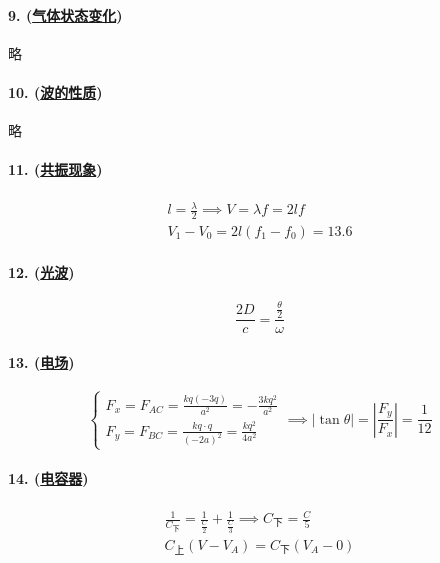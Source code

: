 \paragraph{9. (\hyperref[subsec:气体状态变化]{气体状态变化})} 略

\paragraph{10. (\hyperref[subsec:波的性质]{波的性质})} 略

\paragraph{11. (\hyperref[subsec:共振现象]{共振现象})}

\begin{gather*}
    l=\frac\lambda2\implies V=\lambda f=2lf\\
    V_1-V_0=2l(f_1-f_0)=13.6
\end{gather*}

\paragraph{12. (\hyperref[sec:光波]{光波})}

\begin{equation*}
    \frac{2D}{c}=\frac{\frac\theta2}{\omega}
\end{equation*}

\paragraph{13. (\hyperref[subsec:电场]{电场})}

\begin{equation*}
    \begin{cases}
        F_x=F_{AC}=\frac{kq(-3q)}{a^2}=-\frac{3kq^2}{a^2}\\
        F_y=F_{BC}=\frac{kq\cdot q}{(-2a)^2}=\frac{kq^2}{4a^2}
    \end{cases}\implies
    |\tan\theta|=\left|\frac{F_y}{F_x}\right|=\frac{1}{12}
\end{equation*}

\paragraph{14. (\hyperref[subsec:电容器]{电容器})}

\begin{gather*}
    \frac{1}{C_\text{下}}=\frac{1}{\frac{C}{2}}+\frac{1}{\frac{C}{3}}\implies C_\text{下}=\frac{C}{5}\\
    C_\text{上}(V-V_A)=C_\text{下}(V_A-0)
\end{gather*}

